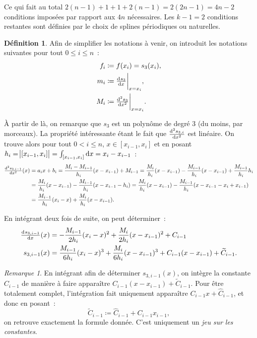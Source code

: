 \documentclass{article}
\theoremstyle{definition}
\newtheorem{déf}[thm]{Définition}
\theoremstyle{remark}
\newtheorem*{rmq}{Remarque}
\begin{document}
		Ce qui fait au total $2(n-1) + 1 + 1 + 2(n-1) = 2(2n-1) = 4n-2$ conditions imposées par rapport aux $4n$ nécessaires. Les $k-1=2$ conditions restantes
		sont définies par le choix de splines périodiques ou naturelles.

		\begin{déf} Afin de simplifier les notations à venir, on introduit les notations suivantes pour tout $0 \leq i \leq n$~:
		\begin{align*}
			f_i &\coloneqq f(x_i) = s_3(x_i), \\
			m_i &\coloneqq \od {s_3}x\bigg\rvert_{x=x_i}, \\
			M_i &\coloneqq \od[2] {s_3}x\bigg\rvert_{x=x_i}.
		\end{align*}
		\end{déf}

		À partir de là, on remarque que $s_3$ est un polynôme de degré 3 (du moins, par morceaux). La propriété intéressante étant le fait que
		$\od[2] {s_{3, i}}x$ est linéaire. On trouve alors pour tout $0 < i \leq n$, $x \in [x_{i-1}, x_i]$ et en posant
		$h_i = \abs{[x_{i-1}, x_i]} = \int_{[x_{i-1}, x_i]}\dif x = x_i - x_{i-1}$~:
		\begin{align*}
			\od[2] {s_{3, i-1}}x(x) &= a_ix + b_i = \frac {M_i - M_{i-1}}{h_i}(x-x_{i-1}) + M_{i-1}
				= \frac {M_i}{h_i}(x-x_{i-1}) - \frac {M_{i-1}}{h_i}(x-x_{i-1}) + \frac {M_{i-1}}{h_i}h_i \\
			&= \frac {M_i}{h_i}(x-x_{i-1}) - \frac {M_{i-1}}{h_i}(x-x_{i-1} - h_i) = \frac {M_i}{h_i}(x-x_{i-1}) - \frac {M_{i-1}}{h_i}(x-x_{i-1} - x_i+x_{i-1}) \\
			&= \frac {M_{i-1}}{h_i}(x_i - x) + \frac {M_i}{h_i}(x-x_{i-1}).
		\end{align*}

		En intégrant deux fois de suite, on peut déterminer~:
		\begin{align*}
			\od {s_{3, i-1}}x(x) &= -\frac {M_{i-1}}{2h_i}(x_i-x)^2 + \frac {M_i}{2h_i}(x-x_{i-1})^2 + C_{i-1} \\
			s_{3,i-1}(x) &= \frac {M_{i-1}}{6h_i}(x_i-x)^3 + \frac {M_i}{6h_i}(x-x_{i-1})^3 + C_{i-1}(x-x_{i-1}) + \widetilde C_{i-1}.
		\end{align*}

		\begin{rmq} En intégrant afin de déterminer $s_{3, i-1}(x)$, on intègre la constante $C_{i-1}$ de manière à faire apparaître
		$C_{i-1}(x-x_{i-1}) + \widetilde C_{i-1}$. Pour être totalement complet, l'intégration fait uniquement apparaître $C_{i-1}x + \widehat C_{i-1}$, et
		donc en posant~:
		\[\widetilde C_{i-1} \coloneqq \widehat C_{i-1} + C_{i-1}x_{i-1},\]
		on retrouve exactement la formule donnée. C'est uniquement un \emph{jeu sur les constantes}.
		\end{rmq}
\end{document}
